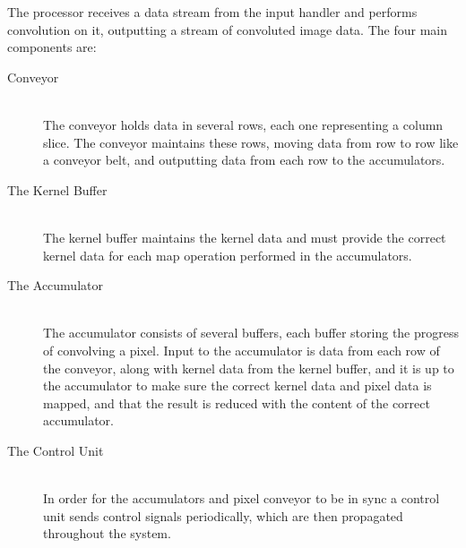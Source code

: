 The processor receives a data stream from the input handler and performs convolution on it, outputting a stream of convoluted image data.
The four main components are:
\begin{description}
    \item[Conveyor] \hfill\\ 
        The conveyor holds data in several rows, each one representing a column slice. The conveyor maintains these rows, moving data from row to row like a conveyor belt, and outputting data from each row to the accumulators.
    \item[The Kernel Buffer] \hfill\\
        The kernel buffer maintains the kernel data and must provide the correct kernel data for each map operation performed in the accumulators.
    \item[The Accumulator] \hfill\\
        The accumulator consists of several buffers, each buffer storing the progress of convolving a pixel.
        Input to the accumulator is data from each row of the conveyor, along with kernel data from the kernel buffer, and it is up to the accumulator to make sure the correct kernel data and pixel data is mapped, and that the result is reduced with the content of the correct accumulator.
    \item[The Control Unit] \hfill\\
        In order for the accumulators and pixel conveyor to be in sync a control unit sends control signals periodically, which are then propagated throughout the system.
\end{description}



